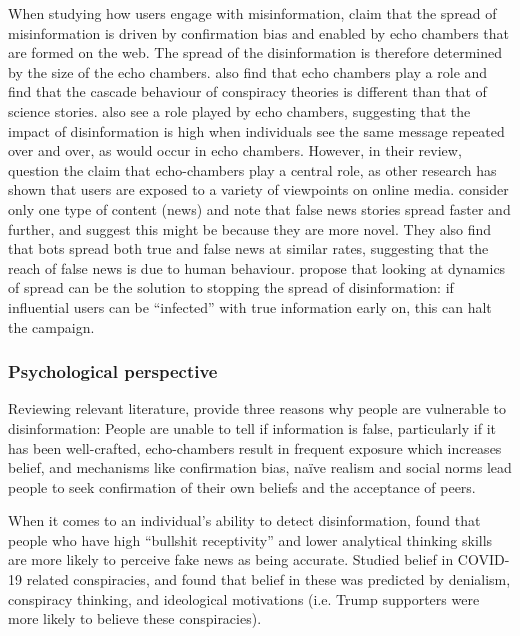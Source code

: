 \documentclass[10pt,a4paper]{article}
\begin{document}
When studying how users engage with misinformation, \cite{Zollo2018} claim that the spread of misinformation is driven by confirmation bias and enabled by echo chambers that are formed on the web. The spread of the disinformation is therefore determined by the size of the echo chambers. \cite{DelVicario2016} also find that echo chambers play a role and find that the cascade behaviour of conspiracy theories is different than that of science stories.  \cite{Kumar2018} also see a role played by echo chambers, suggesting that the impact of disinformation is high when individuals see the same message repeated over and over, as would occur in echo chambers. However, in their review, \cite{Tucker2018} question the claim that echo-chambers play a central role, as other research has shown that users are exposed to a variety of viewpoints on online media. \cite{Vosoughi2018} consider only one type of content (news) and note that false news stories spread faster and further, and suggest this might be because they are more novel. They also find that bots spread both true and false news at similar rates, suggesting that the reach of false news is due to human behaviour. \cite{Budak2011} propose that looking at dynamics of spread can be the solution to stopping the spread of disinformation: if influential users can be “infected” with true information early on, this can halt the campaign. \\



\subsubsection{Psychological perspective}
Reviewing relevant literature, \cite{Kumar2018} provide three reasons why people are vulnerable to disinformation: People are unable to tell if information is false, particularly if it has been well-crafted, echo-chambers result in frequent exposure which increases belief, and mechanisms like confirmation bias, naïve realism and social norms lead people to seek confirmation of their own beliefs and the acceptance of peers. 

When it comes to an individual's ability to detect disinformation, \cite{Pennycook2018} found that people who have high ``bullshit receptivity'' and lower analytical thinking skills are more likely to perceive fake news as being accurate. \cite{uscinski2020people} Studied belief in COVID-19 related conspiracies, and found that belief in these was predicted by denialism, conspiracy thinking, and ideological motivations (i.e. Trump supporters were more likely to believe these conspiracies).
\end{document}
